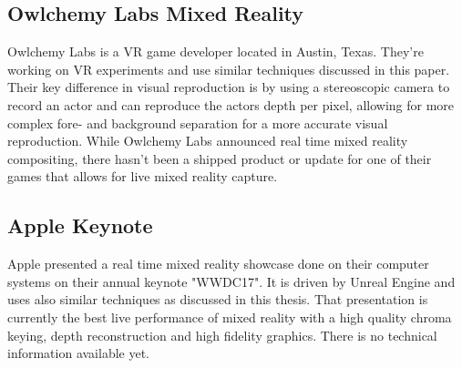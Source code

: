 \subsection{Owlchemy Labs Mixed Reality}

Owlchemy Labs is a VR game developer located in Austin, Texas. They're working 
on VR experiments and use similar techniques discussed in this paper. Their key 
difference in visual reproduction is by using a stereoscopic camera to record 
an actor and can reproduce the actors depth per pixel, allowing for more 
complex fore- and background separation for a more accurate visual reproduction.
\newline
While Owlchemy Labs announced real time mixed reality compositing, there hasn't 
been a shipped product or update for one of their games that allows for live 
mixed reality capture. 

\subsection{Apple Keynote}

Apple presented a real time mixed reality showcase done on their computer 
systems on their annual keynote "WWDC17". It is driven by Unreal Engine and 
uses also similar techniques as discussed in this thesis. That presentation is 
currently the best live performance of mixed reality with a high quality chroma 
keying, depth reconstruction and high fidelity graphics. There is no technical 
information available yet. 